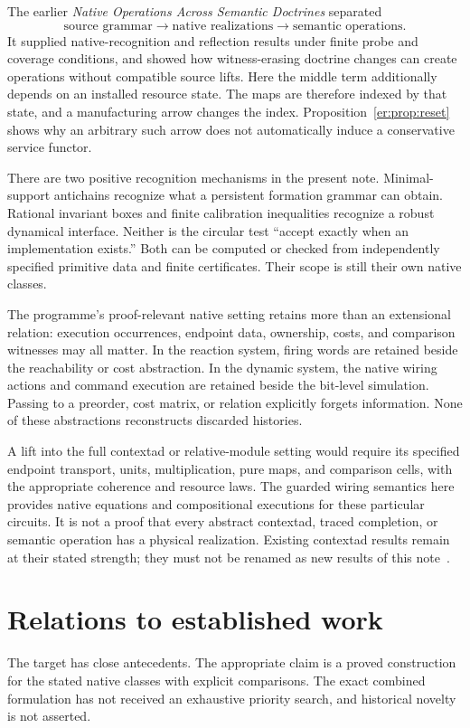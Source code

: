\documentclass[11pt]{article}
\theoremstyle{definition}
\theoremstyle{remark}
\begin{document}
The earlier \emph{Native Operations Across Semantic Doctrines} separated
\[
       \text{source grammar}\longrightarrow
       \text{native realizations}\longrightarrow
       \text{semantic operations}.
\]
It supplied native-recognition and reflection results under finite probe
and coverage conditions, and showed how witness-erasing doctrine changes
can create operations without compatible source lifts. Here the middle
term additionally depends on an installed resource state. The maps are
therefore indexed by that state, and a manufacturing arrow changes the
index. Proposition~\ref{er:prop:reset} shows why an arbitrary such arrow
does not automatically induce a conservative service functor.

There are two positive recognition mechanisms in the present note.
Minimal-support antichains recognize what a persistent formation grammar
can obtain. Rational invariant boxes and finite calibration inequalities
recognize a robust dynamical interface. Neither is the circular test
``accept exactly when an implementation exists.'' Both can be computed
or checked from independently specified primitive data and finite
certificates. Their scope is still their own native classes.

The programme's proof-relevant native setting retains more than an
extensional relation: execution occurrences, endpoint data, ownership,
costs, and comparison witnesses may all matter. In the reaction system,
firing words are retained beside the reachability or cost abstraction.
In the dynamic system, the native wiring actions and command execution
are retained beside the bit-level simulation. Passing to a preorder,
cost matrix, or relation explicitly forgets information. None of these
abstractions reconstructs discarded histories.

A lift into the full contextad or relative-module setting would require
its specified endpoint transport, units, multiplication, pure maps, and
comparison cells, with the appropriate coherence and resource laws.
The guarded wiring semantics here provides native equations and
compositional executions for these particular circuits. It is not a
proof that every abstract contextad, traced completion, or semantic
operation has a physical realization. Existing contextad results remain
at their stated strength; they must not be renamed as new results of
this note~\cite{CM2026}.

\section{Relations to established work}\label{sec:prior}
The target has close antecedents. The appropriate claim is a proved
construction for the stated native classes with explicit comparisons.
The exact combined formulation has not received an exhaustive priority
search, and historical novelty is not asserted.
\end{document}
